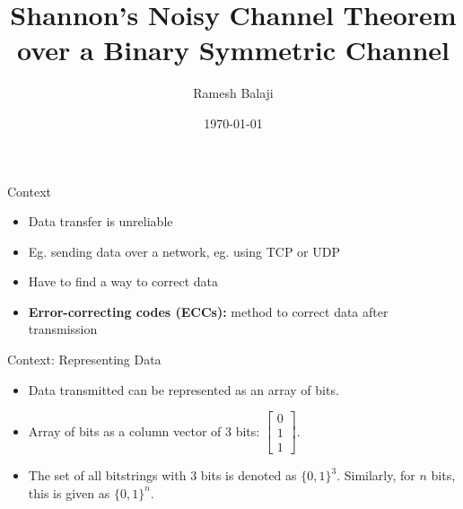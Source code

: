 \documentclass[aspectratio=169]{beamer}
\title{Shannon's Noisy Channel Theorem over a Binary Symmetric Channel}
\author{
    Ramesh Balaji
}
\institute{Rutgers University}
\date{\today}
\begin{document}
\maketitle

\begin{frame}{Context}
\begin{itemize}
  \item Data transfer is unreliable
  \item Eg. sending data over a network, eg. using TCP or UDP
  \item Have to find a way to correct data
  \item \textbf{Error-correcting codes (ECCs): }method to correct data after transmission
\end{itemize}
\end{frame}



\begin{frame}{Context: Representing Data}
\begin{itemize}
    \item Data transmitted can be represented as an array of bits.
    \item Array of bits as a column vector of $3$ bits: \(\begin{bmatrix} 0 \\ 1 \\ 1 \end{bmatrix}.\)
    \item The set of all bitstrings with $3$ bits is denoted as $\{0, 1\}^{3}$. Similarly, for $n$ bits, this is given as $\{0, 1\}^{n}$.
\end{itemize}
\end{frame}
\end{document}
